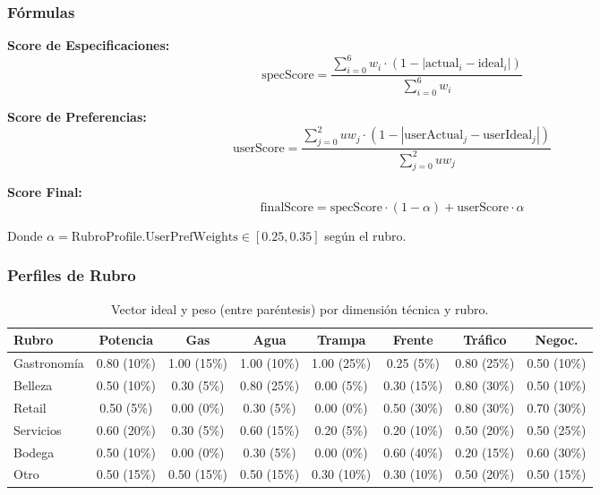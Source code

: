 \documentclass[11pt,a4paper]{article}
\begin{document}
\subsubsection{Fórmulas}

\textbf{Score de Especificaciones:}
\[
\text{specScore} = \frac{\sum_{i=0}^{6} w_i \cdot (1 - |\text{actual}_i - \text{ideal}_i|)}{\sum_{i=0}^{6} w_i}
\]

\textbf{Score de Preferencias:}
\[
\text{userScore} = \frac{\sum_{j=0}^{2} uw_j \cdot (1 - |\text{userActual}_j - \text{userIdeal}_j|)}{\sum_{j=0}^{2} uw_j}
\]

\textbf{Score Final:}
\[
\text{finalScore} = \text{specScore} \cdot (1 - \alpha) + \text{userScore} \cdot \alpha
\]

Donde $\alpha = \text{RubroProfile.UserPrefWeights} \in [0.25, 0.35]$ según el rubro.

\subsubsection{Perfiles de Rubro}

\begin{table}[H]
    \centering
    \renewcommand{\arraystretch}{1.1}
    \begin{tabularx}{\textwidth}{>{\hsize=0.18\hsize}X c c c c c c c}
        \toprule
        \textbf{Rubro} & \textbf{Potencia} & \textbf{Gas} & \textbf{Agua} & \textbf{Trampa} & \textbf{Frente} & \textbf{Tráfico} & \textbf{Negoc.} \\
        \midrule
        Gastronomía & 0.80 (10\%) & 1.00 (15\%) & 1.00 (10\%) & 1.00 (25\%) & 0.25 (5\%) & 0.80 (25\%) & 0.50 (10\%) \\
        Belleza & 0.50 (10\%) & 0.30 (5\%) & 0.80 (25\%) & 0.00 (5\%) & 0.30 (15\%) & 0.80 (30\%) & 0.50 (10\%) \\
        Retail & 0.50 (5\%) & 0.00 (0\%) & 0.30 (5\%) & 0.00 (0\%) & 0.50 (30\%) & 0.80 (30\%) & 0.70 (30\%) \\
        Servicios & 0.60 (20\%) & 0.30 (5\%) & 0.60 (15\%) & 0.20 (5\%) & 0.20 (10\%) & 0.50 (20\%) & 0.50 (25\%) \\
        Bodega & 0.50 (10\%) & 0.00 (0\%) & 0.30 (5\%) & 0.00 (0\%) & 0.60 (40\%) & 0.20 (15\%) & 0.60 (30\%) \\
        Otro & 0.50 (15\%) & 0.50 (15\%) & 0.50 (15\%) & 0.30 (10\%) & 0.30 (10\%) & 0.50 (20\%) & 0.50 (15\%) \\
        \bottomrule
    \end{tabularx}
    \caption{Vector ideal y peso (entre paréntesis) por dimensión técnica y rubro.}
\end{table}
\end{document}
